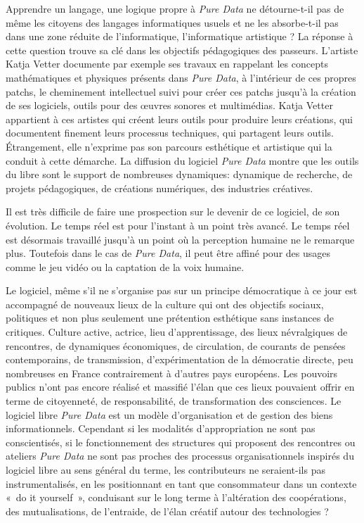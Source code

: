 \documentclass{FramateX}
\begin{document}
\begin{refsection}
Apprendre un langage, une logique propre à \textit{Pure Data} ne détourne-t-il
pas de même les citoyens des langages informatiques usuels et ne les
absorbe-t-il pas dans une zone réduite de l'informatique,
l'informatique artistique ? La réponse à cette question trouve sa clé
dans les objectifs pédagogiques des passeurs. L'artiste Katja Vetter
documente par exemple ses travaux en rappelant les concepts
mathématiques et physiques présents dans \textit{Pure Data}, à l'intérieur de
ces propres patchs, le cheminement intellectuel suivi pour créer ces
patchs jusqu'à la création de ses logiciels, outils pour des œuvres
sonores et multimédias. Katja Vetter appartient à ces artistes qui
créent leurs outils pour produire leurs créations, qui documentent
finement leurs processus techniques, qui partagent leurs outils.
Étrangement, elle n'exprime pas son parcours esthétique et artistique
qui la conduit à cette démarche. La diffusion du logiciel \textit{Pure Data}
montre que les outils du libre sont le support de nombreuses dynamiques: dynamique de recherche, de projets pédagogiques, de créations
numériques, des industries créatives.

Il est très difficile de faire une prospection sur le devenir de ce
logiciel, de son évolution. Le temps réel est pour l'instant à un point
très avancé. Le temps réel est désormais travaillé jusqu'à un point où
la perception humaine ne le remarque plus. Toutefois dans le cas de
\textit{Pure Data}, il peut être affiné pour des usages comme le jeu vidéo ou la
captation de la voix humaine. 

Le logiciel, même s'il ne s'organise pas sur un principe démocratique
à ce jour est accompagné de nouveaux lieux de la culture qui ont des
objectifs sociaux, politiques et non plus seulement une prétention
esthétique sans instances de critiques. Culture active, actrice, lieu
d'apprentissage, des lieux névralgiques de rencontres, de dynamiques
économiques, de circulation, de courants de pensées contemporains, de
transmission, d'expérimentation de la démocratie directe, peu
nombreuses en France contrairement à d'autres pays européens. Les
pouvoirs publics n'ont pas encore réalisé et massifié l'élan que ces
lieux pouvaient offrir en terme de citoyenneté, de responsabilité, de
transformation des consciences. Le logiciel libre \textit{Pure Data} est un
modèle d'organisation et de gestion des biens
informationnels. Cependant si les modalités
d'appropriation ne sont pas conscientisés, si le
fonctionnement des structures qui proposent des rencontres ou ateliers
\textit{Pure Data} ne sont pas proches des processus organisationnels inspirés
du logiciel libre au sens général du terme, les contributeurs ne
seraient-ils pas instrumentalisés, en les positionnant en tant que
consommateur dans un contexte «~do it yourself~», conduisant sur le
long terme à l'altération des coopérations, des
mutualisations, de l'entraide, de
l'élan créatif autour des technologies ?



\end{refsection}
\end{document}
